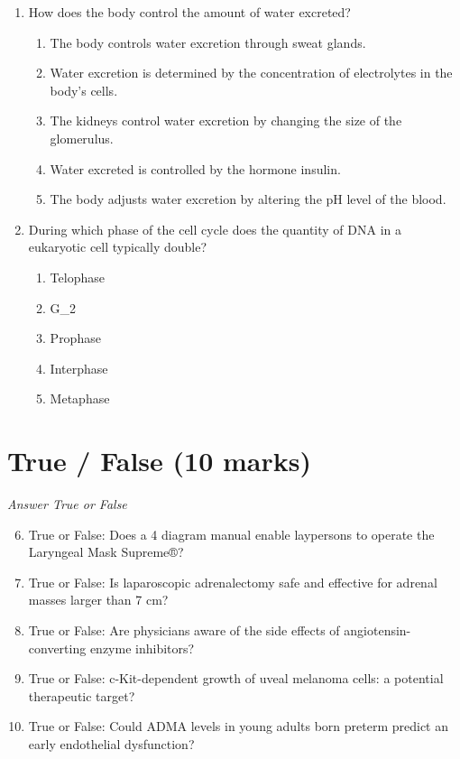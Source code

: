 \documentclass[12pt]{article}
\begin{document}
\begin{enumerate}[label=\arabic*.]
\begin{enumerate}[label=(\alph*)]
\end{enumerate}
\item How does the body control the amount of water excreted?
\begin{enumerate}[label=(\alph*)]
    \item The body controls water excretion through sweat glands.
    \item Water excretion is determined by the concentration of electrolytes in the body's cells.
    \item The kidneys control water excretion by changing the size of the glomerulus.
    \item Water excreted is controlled by the hormone insulin.
    \item The body adjusts water excretion by altering the pH level of the blood.
\end{enumerate}
\item During which phase of the cell cycle does the quantity of DNA in a eukaryotic cell typically double?
\begin{enumerate}[label=(\alph*)]
    \item Telophase
    \item G\_2
    \item Prophase
    \item Interphase
    \item Metaphase
\end{enumerate}
\end{enumerate}

\section*{True / False (10 marks)}
\textit{Answer True or False}
\begin{enumerate}[label=\arabic*.]
\setcounter{enumi}{5}
\item True or False: Does a 4 diagram manual enable laypersons to operate the Laryngeal Mask Supreme®?
\item True or False: Is laparoscopic adrenalectomy safe and effective for adrenal masses larger than 7 cm?
\item True or False: Are physicians aware of the side effects of angiotensin-converting enzyme inhibitors?
\item True or False: c-Kit-dependent growth of uveal melanoma cells: a potential therapeutic target?
\item True or False: Could ADMA levels in young adults born preterm predict an early endothelial dysfunction?
\end{enumerate}
\end{document}
